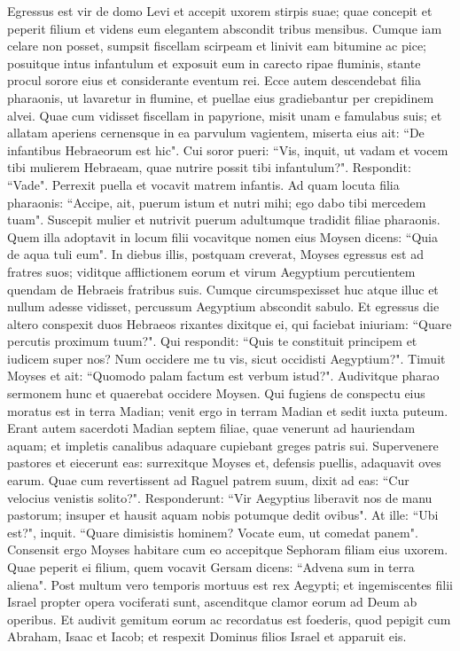 \begin{biblechapter}  
\verse Egressus est vir de domo Levi et accepit uxorem stirpis suae; 
\verse quae concepit et peperit filium et videns eum elegantem abscondit tribus mensibus.  
\verse Cumque iam celare non posset, sumpsit fiscellam scirpeam et linivit eam bitumine ac pice; posuitque intus infantulum et exposuit eum in carecto ripae fluminis, 
\verse stante procul sorore eius et considerante eventum rei. 
\verse Ecce autem descendebat filia pharaonis, ut lavaretur in flumine, et puellae eius gradiebantur per crepidinem alvei. Quae cum vidisset fiscellam in papyrione, misit unam e famulabus suis; et allatam 
\verse aperiens cernensque in ea parvulum vagientem, miserta eius ait: “De infantibus Hebraeorum est hic". 
\verse Cui soror pueri: “Vis, inquit, ut vadam et vocem tibi mulierem Hebraeam, quae nutrire possit tibi infantulum?". 
\verse Respondit: “Vade". Perrexit puella et vocavit matrem infantis. 
\verse Ad quam locuta filia pharaonis: “Accipe, ait, puerum istum et nutri mihi; ego dabo tibi mercedem tuam". Suscepit mulier et nutrivit puerum adultumque tradidit filiae pharaonis. 
\verse Quem illa adoptavit in locum filii vocavitque nomen eius Moysen dicens: “Quia de aqua tuli eum". 
\verse In diebus illis, postquam creverat, Moyses egressus est ad fratres suos; viditque afflictionem eorum et virum Aegyptium percutientem quendam de Hebraeis fratribus suis. 
\verse Cumque circumspexisset huc atque illuc et nullum adesse vidisset, percussum Aegyptium abscondit sabulo. 
\verse Et egressus die altero conspexit duos Hebraeos rixantes dixitque ei, qui faciebat iniuriam: “Quare percutis proximum tuum?". 
\verse Qui respondit: “Quis te constituit principem et iudicem super nos? Num occidere me tu vis, sicut occidisti Aegyptium?". Timuit Moyses et ait: “Quomodo palam factum est verbum istud?". 
\verse Audivitque pharao sermonem hunc et quaerebat occidere Moysen. Qui fugiens de conspectu eius moratus est in terra Madian; venit ergo in terram Madian et sedit iuxta puteum. 
\verse Erant autem sacerdoti Madian septem filiae, quae venerunt ad hauriendam aquam; et impletis canalibus adaquare cupiebant greges patris sui.  
\verse Supervenere pastores et eiecerunt eas: surrexitque Moyses et, defensis puellis, adaquavit oves earum. 
\verse Quae cum revertissent ad Raguel patrem suum, dixit ad eas: “Cur velocius venistis solito?". 
\verse Responderunt: “Vir Aegyptius liberavit nos de manu pastorum; insuper et hausit aquam nobis potumque dedit ovibus". 
\verse At ille: “Ubi est?", inquit. “Quare dimisistis hominem? Vocate eum, ut comedat panem". 
\verse Consensit ergo Moyses habitare cum eo accepitque Sephoram filiam eius uxorem. 
\verse Quae peperit ei filium, quem vocavit Gersam dicens: “Advena sum in terra aliena". 
\verse Post multum vero temporis mortuus est rex Aegypti; et ingemiscentes filii Israel propter opera vociferati sunt, ascenditque clamor eorum ad Deum ab operibus. 
\verse Et audivit gemitum eorum ac recordatus est foederis, quod pepigit cum Abraham, Isaac et Iacob; 
\verse et respexit Dominus filios Israel et apparuit eis. 
\end{biblechapter}

